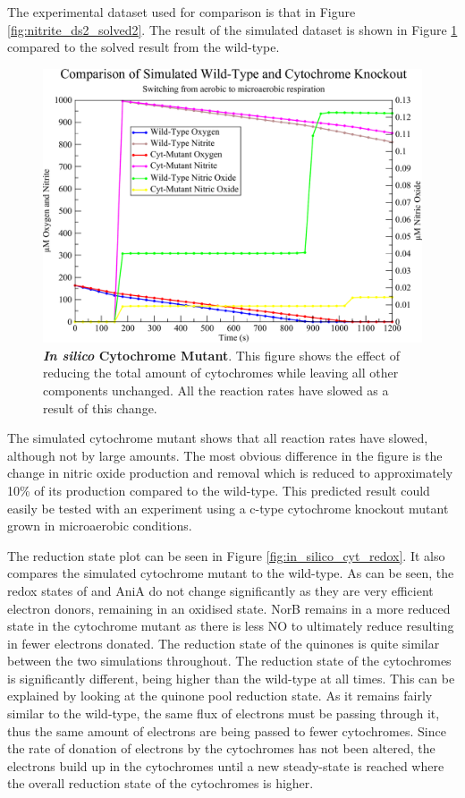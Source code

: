 The experimental dataset used for comparison is that in Figure \ref{fig:nitrite_ds2_solved2}. The result of the simulated dataset is shown in Figure \ref{fig:in_silico_cyt} compared to the solved result from the wild-type.
\begin{figure}[tbp]
 \centering
 \includegraphics[width=15cm, clip=true]{./09-completedmodel/data/in_silico_cyt.pdf}
 \caption[In Silico Cytochrome Mutant]{{\bf \textit{In silico} Cytochrome Mutant}. This figure shows the effect of reducing the total amount of cytochromes while leaving all other components unchanged. All the reaction rates have slowed as a result of this change.
 \label{fig:in_silico_cyt}}
\end{figure}

The simulated cytochrome mutant shows that all reaction rates have slowed, although not by large amounts. The most obvious difference in the figure is the change in nitric oxide production and removal which is reduced to approximately 10\% of its production compared to the wild-type. This predicted result could easily be tested with an experiment using a c-type cytochrome knockout mutant grown in microaerobic conditions.

The reduction state plot can be seen in Figure \ref{fig:in_silico_cyt_redox}. It also compares the simulated cytochrome mutant to the wild-type. As can be seen, the redox states of \cbbthree{} and AniA do not change significantly as they are very efficient electron donors, remaining in an oxidised state. NorB remains in a more reduced state in the cytochrome mutant as there is less NO to ultimately reduce resulting in fewer electrons donated. The reduction state of the quinones is quite similar between the two simulations throughout. The reduction state of the cytochromes is significantly different, being higher than the wild-type at all times. This can be explained by looking at the quinone pool reduction state. As it remains fairly similar to the wild-type, the same flux of electrons must be passing through it, thus the same amount of electrons are being passed to fewer cytochromes. Since the rate of donation of electrons by the cytochromes has not been altered, the electrons build up in the cytochromes 
until a new steady-state is reached where the overall reduction state of the cytochromes is higher.

